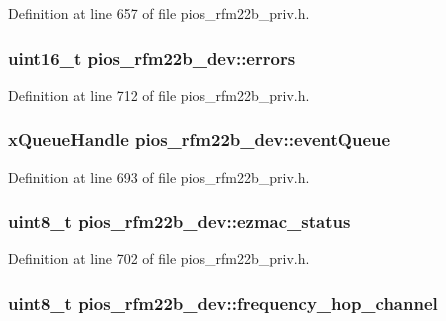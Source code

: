 \-Definition at line 657 of file pios\-\_\-rfm22b\-\_\-priv.\-h.

\hypertarget{structpios__rfm22b__dev_a538dcdf62ddc3430e172d88eb252dc0d}{
\subsubsection[{errors}]{\setlength{\rightskip}{0pt plus 5cm}uint16\-\_\-t {\bf pios\-\_\-rfm22b\-\_\-dev\-::errors}}}\label{structpios__rfm22b__dev_a538dcdf62ddc3430e172d88eb252dc0d}


\-Definition at line 712 of file pios\-\_\-rfm22b\-\_\-priv.\-h.

\hypertarget{structpios__rfm22b__dev_a0c5971f25ea4ab50328105098e54eda7}{
\subsubsection[{event\-Queue}]{\setlength{\rightskip}{0pt plus 5cm}x\-Queue\-Handle {\bf pios\-\_\-rfm22b\-\_\-dev\-::event\-Queue}}}\label{structpios__rfm22b__dev_a0c5971f25ea4ab50328105098e54eda7}


\-Definition at line 693 of file pios\-\_\-rfm22b\-\_\-priv.\-h.

\hypertarget{structpios__rfm22b__dev_ae89edb5d4197faaeab67b5f0b010f5f8}{
\subsubsection[{ezmac\-\_\-status}]{\setlength{\rightskip}{0pt plus 5cm}uint8\-\_\-t {\bf pios\-\_\-rfm22b\-\_\-dev\-::ezmac\-\_\-status}}}\label{structpios__rfm22b__dev_ae89edb5d4197faaeab67b5f0b010f5f8}


\-Definition at line 702 of file pios\-\_\-rfm22b\-\_\-priv.\-h.

\hypertarget{structpios__rfm22b__dev_a27f8f42b03439de7810e39e4240cc9dc}{
\subsubsection[{frequency\-\_\-hop\-\_\-channel}]{\setlength{\rightskip}{0pt plus 5cm}uint8\-\_\-t {\bf pios\-\_\-rfm22b\-\_\-dev\-::frequency\-\_\-hop\-\_\-channel}}}\label{structpios__rfm22b__dev_a27f8f42b03439de7810e39e4240cc9dc}


